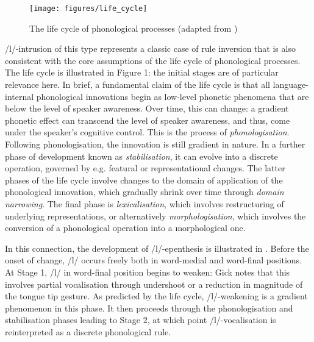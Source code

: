 \documentclass[output=paper,colorlinks,citecolor=brown]{langscibook}
\begin{document}
\begin{figure}
\texttt{[image: figures/life\_cycle]}
\label{fig_1}
\caption{The life cycle of phonological processes (adapted from \citealt[38]{Ramsammy2015})}
\end{figure}

/l/-intrusion of this type represents a classic case of rule inversion \citep{venneinversion, RBO&Börjars2006} that is also consistent with the core assumptions of the life cycle of phonological processes.  The life cycle is illustrated in Figure 1: the initial stages are of particular relevance here.  In brief, a fundamental claim of the life cycle is that all language-internal phonological innovations begin as low-level phonetic phenomena that are below the level of speaker awareness.  Over time, this can change: a gradient phonetic effect can transcend the level of speaker awareness, and thus, come under the speaker's cognitive control. This is the process of \textit{phonologisation}.  Following phonologisation, the innovation is still gradient in nature.  In a further phase of development known as \textit{stabilisation}, it can evolve into a discrete operation, governed by e.g. featural or representational changes. The latter phases of the life cycle involve changes to the domain of application of the phonological innovation, which gradually shrink over time through \textit{domain narrowing}.  The final phase is \textit{lexicalisation}, which involves restructuring of underlying representations, or alternatively \textit{morphologisation}, which involves the conversion of a phonological operation into a morphological one.

In this connection, the development of /l/-epenthesis is illustrated in .  Before the onset of change, /l/ occurs freely both in word-medial and word-final positions.  At Stage 1, /l/ in word-final position begins to weaken: Gick notes that this involves partial vocalisation through undershoot or a reduction in magnitude of the tongue tip gesture.  As predicted by the life cycle, /l/-weakening is a gradient phenomenon in this phase.  It then proceeds through the phonologisation and stabilisation phases leading to Stage 2, at which point /l/-vocalisation is reinterpreted as a discrete phonological rule.
\end{document}
